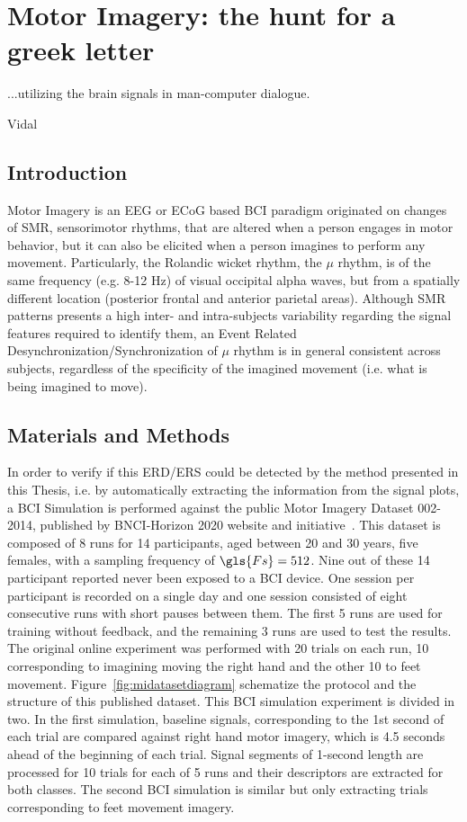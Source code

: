 \chapter{Motor Imagery: the hunt for a greek letter}
\label{chapter:five}
\epigraph{...utilizing the brain signals in man-computer dialogue.}{Vidal}

\section{Introduction}

Motor Imagery is an EEG or ECoG based BCI paradigm originated on changes of SMR, sensorimotor rhythms, that are altered when a person engages in motor behavior, but it can also be elicited when a person imagines to perform any movement. Particularly, the Rolandic wicket rhythm, the $\mu$ rhythm, is of the same frequency (e.g. 8-12 Hz) of visual occipital alpha waves, but from a spatially different location (posterior frontal and anterior parietal areas)\cite{WolpawJonathanR2012}.   Although SMR patterns presents a high inter- and intra-subjects variability regarding the signal features required to identify them, an Event Related Desynchronization/Synchronization of $\mu$ rhythm is in general consistent across subjects, regardless of the specificity of the imagined movement (i.e. what is being imagined to move).

\section{Materials and Methods}

In order to verify if this ERD/ERS could be detected by the method presented in this Thesis, i.e. by automatically extracting the information from the signal plots, a BCI Simulation is performed against the public Motor Imagery Dataset 002-2014, published by BNCI-Horizon 2020 website and initiative~\cite{Steyrl2015}.  This dataset is composed of 8 runs for 14 participants, aged between 20 and 30 years, five females, with a sampling frequency of $\gls{Fs} = 512$. Nine out of these 14 participant reported never been exposed to a BCI device.  One session per participant is recorded on a single day and one session consisted of eight consecutive runs with short pauses between them.  The first 5 runs are used for training without feedback, and the remaining 3 runs are used to test the results.  The original online experiment was performed with 20 trials on each run, 10 corresponding to imagining moving the right hand and the other 10 to feet movement.  Figure~\ref{fig:midatasetdiagram} schematize the protocol and the structure of this published dataset.  This BCI simulation experiment is divided in two.  In the first simulation, baseline signals, corresponding to the 1st second of each trial are compared against right hand motor imagery, which is 4.5 seconds ahead of the beginning of each trial. Signal segments of 1-second length are processed for 10 trials for each of 5 runs and their descriptors are extracted for both classes.  The second BCI simulation is similar but only extracting trials corresponding to feet movement imagery.



